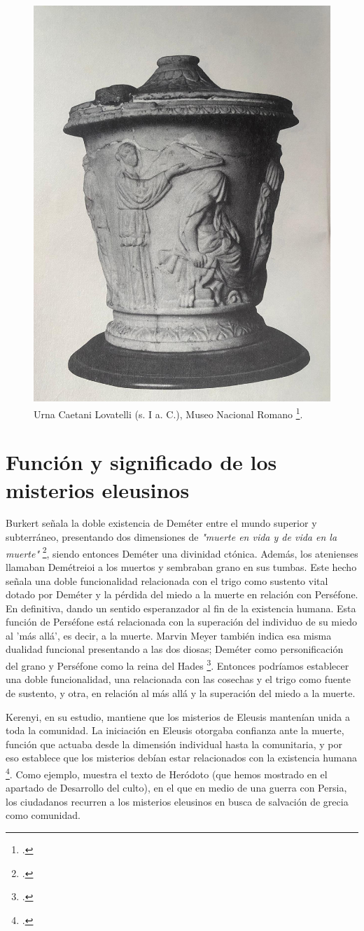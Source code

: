 \begin{figure}[h!]
	\centering
	\includegraphics[width=0.45\linewidth]{Imagenes/Urna2}
	\caption{Urna Caetani Lovatelli (s. I a. C.), Museo Nacional Romano \footcite[53-66]{burkertAncientMysteryCults1987}.}
	\label{fig:urna-2}
\end{figure}


\section{Función y significado de los misterios eleusinos}

Burkert señala la doble existencia de Deméter entre el mundo superior y subterráneo, presentando dos dimensiones de \textit{"muerte en vida y de vida en la muerte"} \footcite[310]{burkertReligionGriegaArcaica2007}, siendo entonces Deméter una divinidad ctónica. Además, los atenienses llamaban Demétreioi a los muertos y sembraban grano en sus tumbas. Este hecho señala una doble funcionalidad relacionada con el trigo como sustento vital dotado por Deméter y la pérdida del miedo a la muerte en relación con Perséfone. En definitiva, dando un sentido esperanzador al fin de la existencia humana. Esta función de Perséfone está relacionada con la superación del individuo de su miedo al 'más allá', es decir, a la muerte. Marvin Meyer también indica esa misma dualidad funcional presentando a las dos diosas; Deméter como personificación del grano y Perséfone como la reina del Hades \footcite[12]{w.meyerAncientMysteriesSource1986}. Entonces podríamos establecer una doble funcionalidad, una relacionada con las cosechas y el trigo como fuente de sustento, y otra, en relación al más allá y la superación del miedo a la muerte.

Kerenyi, en su estudio, mantiene que los misterios de Eleusis mantenían unida a toda la comunidad. La iniciación en Eleusis otorgaba confianza ante la muerte, función que actuaba desde la dimensión individual hasta la comunitaria, y por eso establece que los misterios debían estar relacionados con la existencia humana \footcite[31]{kerenyiEleusisImagenArquetipica2004}. Como ejemplo, muestra el texto de Heródoto (que hemos mostrado en el apartado de Desarrollo del culto), en el que en medio de una guerra con Persia, los ciudadanos recurren a los misterios eleusinos en busca de salvación de grecia como comunidad.

